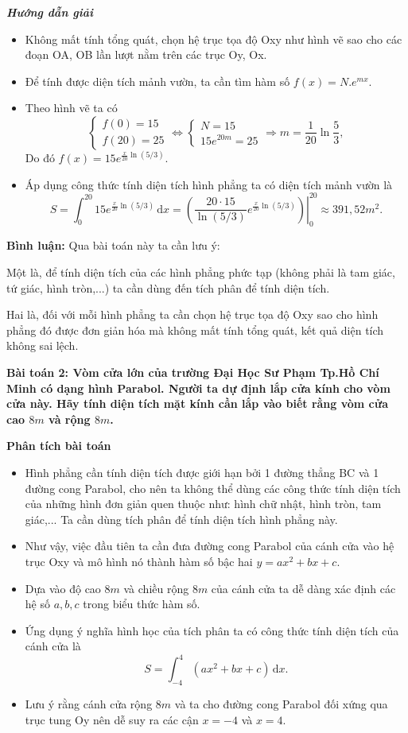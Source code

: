 \documentclass[12pt,a4paper]{article}
\newcommand{\dd}{\,\mathrm{d}}
\newcommand{\analysis}{\noindent\raisebox{0.15ex}{\rule{1.6ex}{1.6ex}}\hspace{4pt}\textbf{Phân tích bài toán}\par}
\newcommand{\solution}{\begin{center}\textbf{\textit{Hướng dẫn giải}}\end{center}\par}
\newcommand{\commenthead}{\textbf{Bình luận:} Qua bài toán này ta cần lưu ý:\par}
\begin{document}
\solution
\begin{itemize}
\item Không mất tính tổng quát, chọn hệ trục tọa độ Oxy như hình vẽ sao cho các đoạn OA, OB lần lượt nằm trên các trục Oy, Ox.
\item Để tính được diện tích mảnh vườn, ta cần tìm hàm số $f(x)=N.e^{mx}$.
\item Theo hình vẽ ta có
\[
\begin{cases}f(0)=15\\f(20)=25\end{cases}
\Longleftrightarrow
\begin{cases}N=15\\15e^{20m}=25\end{cases}
\Longrightarrow
m=\frac1{20}\ln\frac53,
\]
Do đó $f(x)=15e^{\frac{x}{20}\ln(5/3)}$.
\item Áp dụng công thức tính diện tích hình phẳng ta có diện tích mảnh vườn là
\[
S=\int_0^{20}15e^{\frac{x}{20}\ln(5/3)}\dd x
=\left.\left(\frac{20 \cdot 15}{\ln(5/3)}e^{\frac{x}{20}\ln(5/3)}\right)\right|_0^{20}
\approx391,52m^2.
\]
\end{itemize}

\begin{commentbox}\commenthead
Một là, để tính diện tích của các hình phẳng phức tạp (không phải là tam giác, tứ giác, hình tròn,...) ta cần dùng đến tích phân để tính diện tích.

Hai là, đối với mỗi hình phẳng ta cần chọn hệ trục tọa độ Oxy sao cho hình phẳng đó được đơn giản hóa mà không mất tính tổng quát, kết quả diện tích không sai lệch.

\end{commentbox}\textbf{Bài toán 2: Vòm cửa lớn của trường Đại Học Sư Phạm Tp.Hồ Chí Minh có dạng hình Parabol. Người ta dự định lắp cửa kính cho vòm cửa này. Hãy tính diện tích mặt kính cần lắp vào biết rằng vòm cửa cao $8m$ và rộng $8m$.}\par\medskip
\begin{analysisbox}
\analysis
\begin{itemize}
\item Hình phẳng cần tính diện tích được giới hạn bởi 1 đường thẳng BC và 1 đường cong Parabol, cho nên ta không thể dùng các công thức tính diện tích của những hình đơn giản quen thuộc như: hình chữ nhật, hình tròn, tam giác,... Ta cần dùng tích phân để tính diện tích hình phẳng này.
\item Như vậy, việc đầu tiên ta cần đưa đường cong Parabol của cánh cửa vào hệ trục Oxy và mô hình nó thành hàm số bậc hai $y=ax^2+bx+c$.
\item Dựa vào độ cao $8m$ và chiều rộng $8m$ của cánh cửa ta dễ dàng xác định các hệ số $a,b,c$ trong biểu thức hàm số.
\item Ứng dụng ý nghĩa hình học của tích phân ta có công thức tính diện tích của cánh cửa là
\[
S=\int_{-4}^{4}(ax^2+bx+c)\dd x.
\]
\item Lưu ý rằng cánh cửa rộng $8m$ và ta cho đường cong Parabol đối xứng qua trục tung Oy nên dễ suy ra các cận $x=-4$ và $x=4$.
\end{itemize}
\end{analysisbox}
\end{document}
